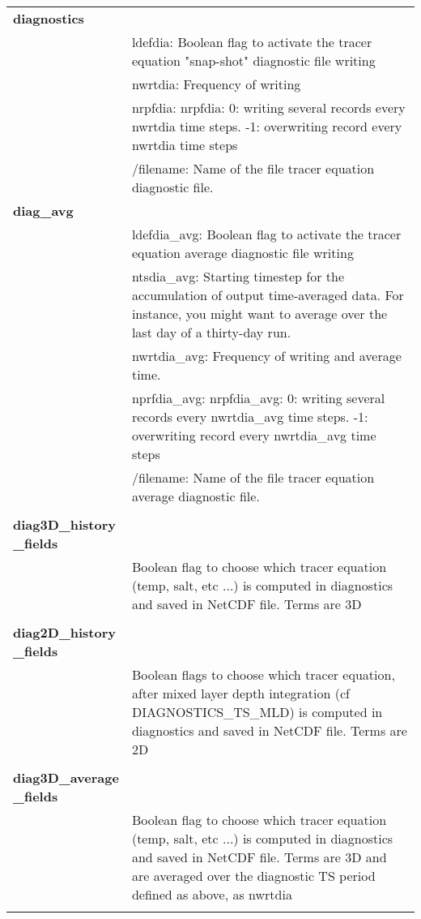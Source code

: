 \begin{longtable}{|p{0.25\linewidth}|p{0.75\linewidth}|}
\large{\textbf{diagnostics}} &     \\
&ldefdia: Boolean flag to activate the tracer equation "snap-shot" diagnostic file writing \\
&nwrtdia: Frequency of writing     \\
&nrpfdia: nrpfdia: 0: writing several records every nwrtdia time steps. -1: overwriting record
every nwrtdia time steps   \\
&/filename: Name of the file tracer equation diagnostic file.\\

\large{\textbf{diag\_avg}} &     \\
&ldefdia\_avg: Boolean flag to activate the tracer equation average diagnostic file writing  \\
&ntsdia\_avg: Starting timestep for the accumulation of output time-averaged data. For
instance, you might want to average over the last day of a thirty-day run.  \\
&nwrtdia\_avg: Frequency of writing and average time.   \\
&nprfdia\_avg: nrpfdia\_avg: 0: writing several records every nwrtdia\_avg time steps. -1: overwriting record
every nwrtdia\_avg time steps \\
&/filename: Name of the file tracer equation average diagnostic file. \\
&  \\ 

\large{\textbf{diag3D\_history \_fields}} &     \\
& Boolean  flag to choose which tracer equation (temp, salt, etc ...) is computed in
diagnostics and saved in NetCDF file. Terms are 3D \\
& \\

\large{\textbf{diag2D\_history \_fields}} &     \\
& Boolean flags to choose which tracer equation, after mixed layer depth integration (cf
DIAGNOSTICS\_TS\_MLD) is computed in diagnostics and saved in NetCDF file. Terms are 2D\\
& \\

\large{\textbf{diag3D\_average \_fields}} &     \\
& Boolean  flag to choose which tracer equation (temp, salt, etc ...) is computed in
diagnostics and saved in NetCDF file. Terms are 3D and are averaged over the diagnostic TS
period defined as above, as nwrtdia\\
& \\


\end{longtable}
